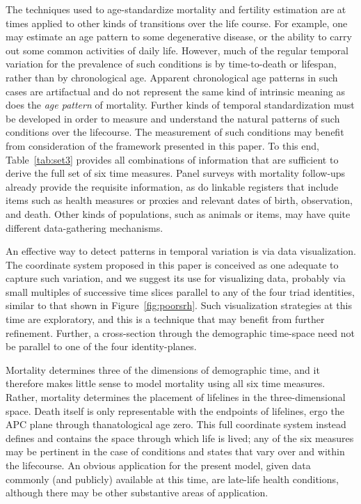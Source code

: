 \documentclass[12pt,oneside,a4paper]{article} %
\theoremstyle{definition}
\begin{document}
The techniques used to age-standardize mortality and fertility estimation are at
times applied to other kinds of transitions over the life course. For example,
one may estimate an age pattern to some degenerative disease, or the
ability to carry out some common activities of daily life. However, much of the
regular temporal variation for the prevalence of such conditions is by
time-to-death or lifespan, rather than by chronological age. Apparent chronological age patterns
in such cases are artifactual and do not represent the same kind of
intrinsic meaning as does the \textit{age pattern} of mortality. Further kinds
of temporal standardization must be developed in order to measure and understand
the natural patterns of such conditions over the lifecourse. 
The measurement of
such conditions may benefit from consideration of the framework presented in
this paper. To this end, Table~\ref{tab:set3} provides all combinations of
information that are sufficient to derive the full set of six time measures.
Panel surveys with mortality follow-ups already provide the requisite
information, as do linkable registers that include items such as
health measures or proxies and relevant dates of birth, observation, and death.
Other kinds of populations, such as animals or items, may have quite different
data-gathering mechanisms.

An effective way to detect patterns in temporal variation
is via data visualization. The coordinate system proposed in this paper is
conceived as one adequate to capture such variation, and we suggest its use
for visualizing data, probably via small multiples of successive time slices
parallel to any of the four triad identities, similar to that shown in
Figure~\ref{fig:poorsrh}.
Such visualization strategies at this time are exploratory, and this is a
technique that may benefit from further refinement. Further, a cross-section
through the demographic time-space need not be parallel to one of the four
identity-planes.

Mortality determines three of the dimensions of
demographic time, and it therefore makes little sense to model mortality using
all six time measures. Rather, mortality determines the placement of
lifelines in the three-dimensional space. Death itself is only representable
with the endpoints of lifelines, ergo the APC plane through thanatological age
zero. This full coordinate system instead defines and contains the space through
which life is lived; any of the six measures may be pertinent in the case of
conditions and states that vary over and within the lifecourse. An obvious
application for the present model, given data commonly (and publicly) available at this time, are late-life health conditions, although there may be other substantive areas of application. 
\end{document}

